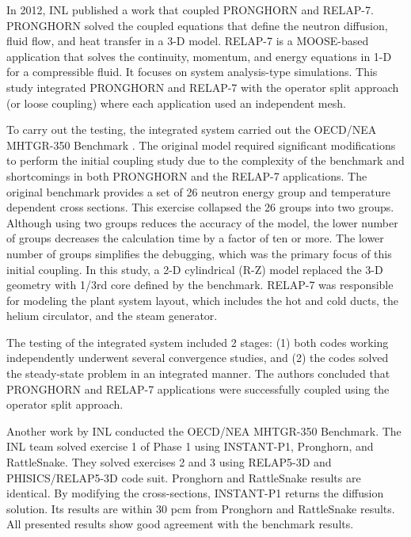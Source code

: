 \documentclass[11pt,letterpaper]{article}
\begin{document}
In 2012, \gls{INL} published a work \cite{j_ortensi_initial_2012} that coupled PRONGHORN and RELAP-7.
PRONGHORN solved the coupled equations that define the neutron diffusion, fluid flow, and heat transfer in a 3-D  model.
RELAP-7 is a MOOSE-based application that solves the continuity, momentum, and energy equations in 1-D for a compressible fluid.
It focuses on system analysis-type simulations.
This study integrated PRONGHORN and RELAP-7 with the operator split approach (or loose coupling) where each application used an independent mesh.

To carry out the testing, the integrated system carried out the OECD/NEA MHTGR-350 Benchmark \cite{oecd_nea_benchmark_2017}.
The original model required significant modifications to perform the initial coupling study due to the complexity of the benchmark and shortcomings in both PRONGHORN and the RELAP-7 applications.
The original benchmark provides a set of 26 neutron energy group and temperature dependent cross sections.
This exercise collapsed the 26 groups into two groups.
Although using two groups reduces the accuracy of the model, the lower number of groups decreases the calculation time by a factor of ten or more.
The lower number of groups simplifies the debugging, which was the primary focus of this initial coupling.
In this study, a 2-D cylindrical (R-Z) model replaced the 3-D geometry with 1/3rd core defined by the benchmark.
RELAP-7 was responsible for modeling the plant system layout, which includes the hot and cold ducts, the helium circulator, and the steam generator.

The testing of the integrated system included 2 stages: (1) both codes working independently underwent several convergence studies, and (2) the codes solved the steady-state problem in an integrated manner.
The authors concluded that PRONGHORN and RELAP-7 applications were successfully coupled using the operator split approach.

Another work by \gls{INL} \cite{strydom_inl_2013} conducted the OECD/NEA MHTGR-350 Benchmark.
The \gls{INL} team solved exercise 1 of Phase 1 using INSTANT-P1, Pronghorn, and RattleSnake.
They solved exercises 2 and 3 using RELAP5-3D and PHISICS/RELAP5-3D code suit.
Pronghorn and RattleSnake results are identical.
By modifying the cross-sections, INSTANT-P1 returns the diffusion solution.
Its results are within 30 pcm from Pronghorn and RattleSnake results.
All presented results show good agreement with the benchmark results.
\end{document}
